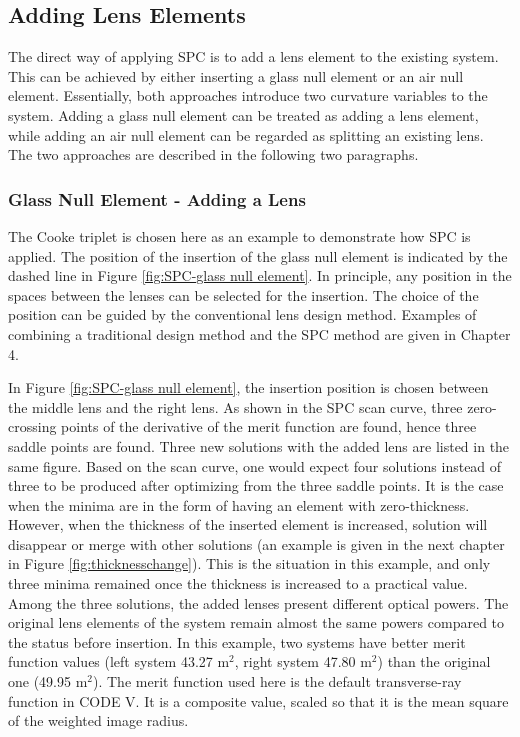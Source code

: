 \subsection{Adding Lens Elements}
The direct way of applying SPC is to add a lens element to the existing system. This can be achieved by either inserting a glass null element or an air null element. Essentially, both approaches introduce two curvature variables to the system. Adding a glass null element can be treated as adding a lens element, while adding an air null element can be regarded as splitting an existing lens. The two approaches are described in the following two paragraphs.

\subsubsection{Glass Null Element - Adding a Lens}
The Cooke triplet is chosen here as an example to demonstrate how SPC is applied. 
The position of the insertion of the glass null element is indicated by the dashed line in Figure \ref{fig:SPC-glass null element}. In principle, any position in the spaces between the lenses can be selected for the insertion. The choice of the position can be guided by the conventional lens design method. Examples of combining a traditional design method and the SPC method are given in Chapter 4.

In Figure \ref{fig:SPC-glass null element}, the insertion position is chosen between the middle lens and the right lens. As shown in the SPC scan curve, three zero-crossing points of the derivative of the merit function are found, hence three saddle points are found. Three new solutions with the added lens are listed in the same figure. Based on the scan curve, one would expect four solutions instead of three to be produced after optimizing from the three saddle points. It is the case when the minima are in the form of having an element with zero-thickness. However, when the thickness of the inserted element is increased, solution will disappear or merge with other solutions (an example is given in the next chapter in Figure \ref{fig:thicknesschange}). This is the situation in this example, and only three minima remained once the thickness is increased to a practical value. Among the three solutions, the added lenses present different optical powers. The original lens elements of the system remain almost the same powers compared to the status before insertion. In this example, two systems have better merit function values (left system 43.27 \textmu m$^2$, right system 47.80 \textmu m$^2$) than the original one (49.95 \textmu m$^2$). The merit function used here is the default transverse-ray function in CODE V. It is a composite value, scaled so that it is the mean square of the weighted image radius.

